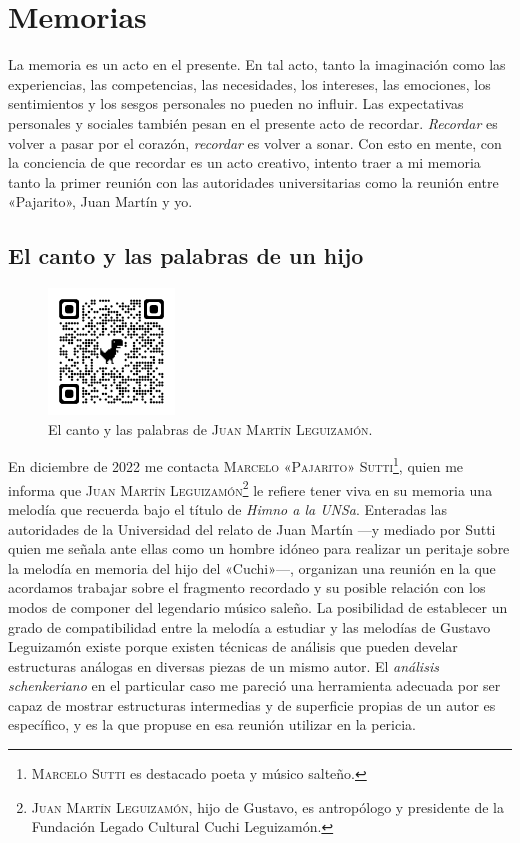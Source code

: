 \chapter{Memorias}
\label{cap:memorias}

La memoria es un acto en el presente. En tal acto, tanto la imaginación como las experiencias, las competencias, las necesidades, los intereses, las emociones, los sentimientos y los sesgos personales no pueden no influir. Las expectativas personales y sociales también pesan en el presente acto de recordar. \emph{Recordar} es volver a pasar por el corazón, \emph{recordar} es volver a sonar. Con esto en mente, con la conciencia de que recordar es un acto creativo, intento traer a mi memoria tanto la primer reunión con las autoridades universitarias como la reunión entre «Pajarito», Juan Martín y yo.


\section{El canto y las palabras de un hijo}
\label{sec:palabra-canto}

\begin{figure}[H]
\centering
\includegraphics[width=0.3\textwidth]{img/qrcode-himno-memoria}
\caption{El canto y las palabras de \textsc{Juan Martín Leguizamón}.}
\label{fig:canto-palabras}
\end{figure}


En diciembre de 2022 me contacta \textsc{Marcelo «Pajarito» Sutti}\footnote{\textsc{Marcelo Sutti} es destacado poeta y músico salteño.}, quien me informa que \textsc{Juan Martín Leguizamón}\footnote{\textsc{Juan Martín Leguizamón}, hijo de Gustavo, es antropólogo y presidente de la Fundación Legado Cultural Cuchi Leguizamón.} le refiere tener viva en su memoria una melodía que recuerda bajo el título de \emph{Himno a la UNSa}. Enteradas las autoridades de la Universidad del relato de Juan Martín ---y mediado por Sutti quien me señala ante ellas como un hombre idóneo para realizar un peritaje sobre la melodía en memoria del hijo del «Cuchi»---, organizan una reunión en la que acordamos trabajar sobre el fragmento recordado y su posible relación con los modos de componer del legendario músico saleño. La posibilidad de establecer un grado de compatibilidad entre la melodía a estudiar y las melodías de Gustavo Leguizamón existe porque existen técnicas de análisis que pueden develar estructuras análogas en diversas piezas de un mismo autor. El \emph{análisis schenkeriano} en el particular caso me pareció una herramienta adecuada por ser capaz de mostrar estructuras intermedias y de superficie propias de un autor es específico, y es la que propuse en esa reunión utilizar en la pericia.

